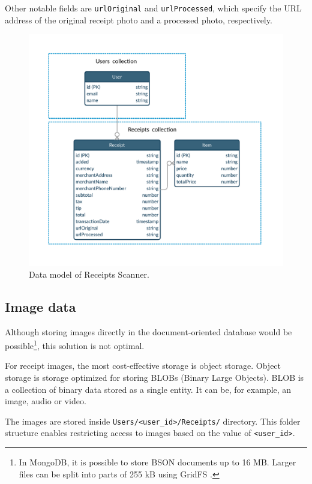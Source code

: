\documentclass[
  printed, %
  table,   %
  oneside, %
  lof,     %
  lot,     %
]{fithesis3}
\newcommand{\definition}[1]{{#1}}
\begin{document}
Other notable fields are \texttt{urlOriginal} and \texttt{urlProcessed}, which specify the URL address of the original receipt photo and a processed photo, respectively. 

    \begin{figure}
        \begin{center}
            \includegraphics[width=\textwidth]{figures/other/data_model_firestore}
        \end{center}
        \caption{Data model of Receipts Scanner.}
        \label{fig:data_model_firestore}
    \end{figure}

\subsection{Image data}
Although storing images directly in the document-oriented database would be possible\footnote{In MongoDB, it is possible to store BSON documents up to 16 MB. Larger files can be split into parts of 255 kB using GridFS \cite{GridFS}.}, this solution is not optimal.

For receipt images, the most cost-effective storage is object storage. \definition{Object storage} is storage optimized for storing BLOBs (Binary Large Objects). BLOB is a collection of binary data stored as a single entity. It can be, for example, an image, audio or video. 

The images are stored inside \texttt{Users/<user\_id>/Receipts/} directory. This folder structure enables restricting access to images based on the value of \texttt{<user\_id>}.
\end{document}

